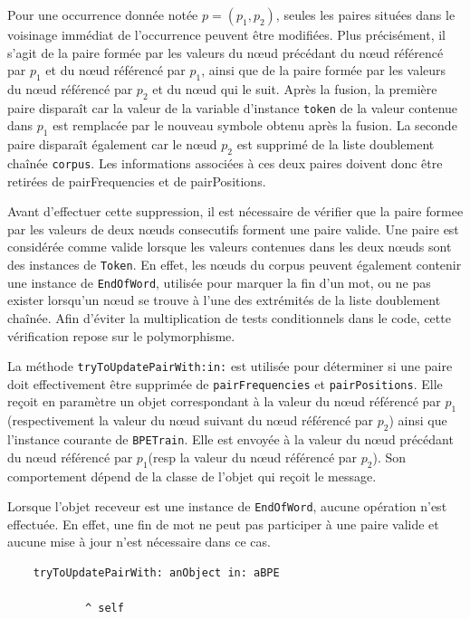 \documentclass[12pt,a4paper]{report}
\begin{document}
	Pour une occurrence donnée notée $p=(p_1,p_2)$, seules les paires situées dans le voisinage immédiat de l’occurrence peuvent être modifiées. Plus précisément, il s’agit de la paire formée par les valeurs du nœud précédant du nœud référencé par $p_1$ et du nœud référencé par $p_1$, ainsi que de la paire formée par les valeurs du nœud référencé par $p_2$ et du nœud qui le suit. Après la fusion, la première paire disparaît car la valeur de la variable d'instance \texttt{token} de la valeur contenue dans $p_1$ est remplacée par le nouveau symbole obtenu après la fusion. La seconde paire disparaît également car le nœud $p_2$ est supprimé de la liste doublement chaînée \texttt{corpus}. Les informations associées à ces deux paires doivent donc être retirées de pairFrequencies et de pairPositions.
	
	Avant d’effectuer cette suppression, il est nécessaire de vérifier que la paire formee par les valeurs de deux nœuds consecutifs forment une paire valide. Une paire est considérée comme valide lorsque les valeurs contenues dans les deux nœuds sont des instances de \texttt{Token}. En effet, les nœuds du corpus peuvent également contenir une instance de \texttt{EndOfWord}, utilisée pour marquer la fin d’un mot, ou ne pas exister lorsqu’un nœud se trouve à l’une des extrémités de la liste doublement chaînée. Afin d’éviter la multiplication de tests conditionnels dans le code, cette vérification repose sur le polymorphisme.
	
	La méthode \texttt{tryToUpdatePairWith:in:} est utilisée pour déterminer si une paire doit effectivement être supprimée de \texttt{pairFrequencies} et \texttt{pairPositions}. Elle reçoit en paramètre un objet correspondant à la valeur du nœud référencé par $p_1$(respectivement la valeur du nœud suivant du nœud référencé par $p_2$) ainsi que l’instance courante de \texttt{BPETrain}. Elle est envoyée à la valeur du nœud précédant du nœud référencé par $p_1$(resp la valeur du nœud référencé par $p_2$). Son comportement dépend de la classe de l’objet qui reçoit le message.
	
	Lorsque l’objet receveur est une instance de \texttt{EndOfWord}, aucune opération n’est effectuée. En effet, une fin de mot ne peut pas participer à une paire valide et aucune mise à jour n’est nécessaire dans ce cas.
	
	\begin{verbatim}
	tryToUpdatePairWith: anObject in: aBPE
	
			^ self
	\end{verbatim}
	
\end{document}
